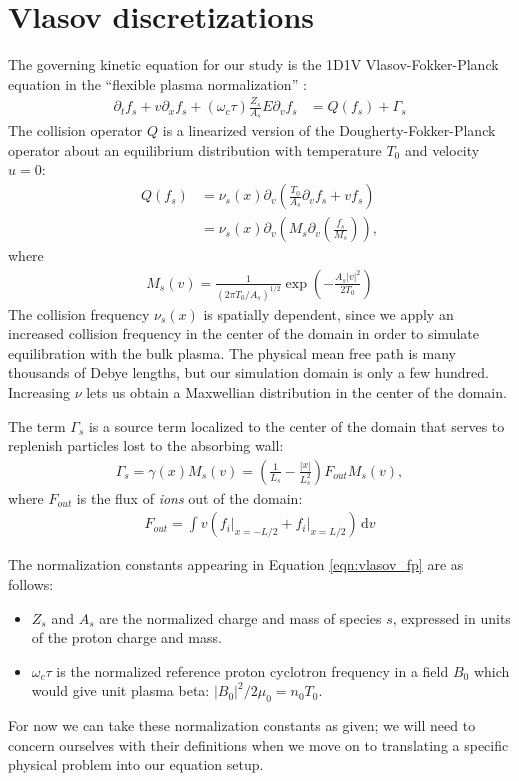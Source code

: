 \documentclass{article}
\begin{document}
\section{Vlasov discretizations}

The governing kinetic equation for our study is the 1D1V Vlasov-Fokker-Planck equation in
the ``flexible plasma normalization'' \cite{millerMultispecies13momentModel2016}:
\begin{align}
    \label{eqn:vlasov_fp}
    \partial_t f_s + v \partial_x f_s + (\omega_c \tau) \frac{Z_s}{A_s} E \partial_v f_s &= Q(f_s) + \Gamma_s
\end{align}
The collision operator $Q$ is a linearized version of the Dougherty-Fokker-Planck operator about an equilibrium
distribution with temperature $T_{0}$ and velocity $u = 0$:
\begin{align*}
    Q(f_s) &= \nu_s(x) \partial_v \left( \frac{T_{0}}{A_s} \partial_v f_s + v f_s \right) \\
            \label{eqn:maxwellian_collisional}
        &= \nu_s(x) \partial_v \left( M_s \partial_v \left( \frac{f_s}{M_s} \right) \right),
\end{align*}
where
\begin{align*}
    M_s(v) = \frac{1}{(2\pi T_0/A_s)^{1/2}} \exp \left( -\frac{A_s|v|^2}{2T_0} \right) 
\end{align*}
The collision frequency $\nu_s(x)$ is spatially dependent, since we apply an increased collision frequency in the center of the domain
in order to simulate equilibration with the bulk plasma.
The physical mean free path is many thousands of Debye lengths, but our simulation domain is only a few hundred.
Increasing $\nu$ lets us obtain a Maxwellian distribution in the center of the domain.

The term $\Gamma_s$ is a source term localized to the center of the domain that serves to replenish particles lost to
the absorbing wall:
\begin{align*}
    \Gamma_s = \gamma(x) M_s(v) = \left( \frac{1}{L_s} - \frac{|x|}{L_s^2} \right) F_{out} M_s(v),
\end{align*}
where $F_{out}$ is the flux of \emph{ions} out of the domain:
\begin{align*}
    F_{out} = \int v \left( f_i \vert_{x=-L/2} + f_i \vert_{x=L/2} \right) \, \mathrm{d} v
\end{align*}

The normalization constants appearing in Equation \eqref{eqn:vlasov_fp} are as follows:
\begin{itemize}
    \item $Z_s$ and $A_s$ are the normalized charge and mass of species $s$, expressed in units of the proton charge and mass.
    \item $\omega_c \tau$ is the normalized reference proton cyclotron frequency in a field $B_0$ which would give unit plasma beta: $|B_0|^2 / 2 \mu_0 = n_0 T_0$.
\end{itemize}
For now we can take these normalization constants as given; we will need to concern ourselves with their definitions when we
move on to translating a specific physical problem into our equation setup.
\end{document}
